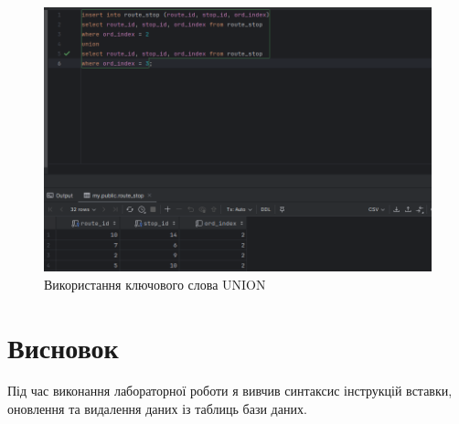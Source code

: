\documentclass[14pt]{extreport}
\begin{document}
\begin{normalsize}
	\begin{figure}[H]
		\centering
		\includegraphics[scale=0.5]{2}
		\caption{Використання ключового слова UNION}
	\end{figure}
	
	\section*{Висновок}
	Під час виконання лабораторної роботи я вивчив синтаксис інструкцій вставки, оновлення та видалення даних із	таблиць бази даних.
	 
\end{normalsize}
\end{document}
